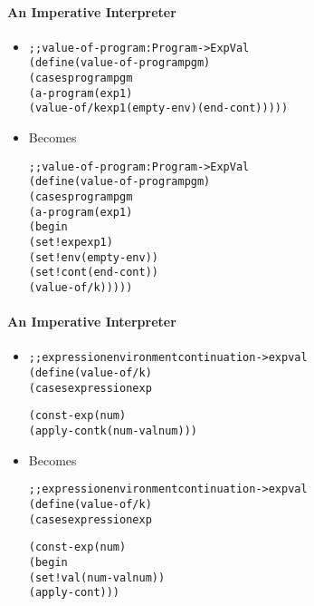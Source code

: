 \documentclass{beamer}
\begin{document}
\begin{frame}[fragile]
\framesubtitle{An Imperative Interpreter}
\begin{scriptsize}
\begin{itemize}
\item<1-> 
\begin{alltt}
;; value-of-program : Program -> ExpVal
(define (value-of-program pgm)
  (cases program pgm
    (a-program (exp1)
               (value-of/k exp1 (empty-env) (end-cont)))))
\end{alltt}

\item<1-> Becomes
\begin{alltt}
;; value-of-program : Program -> ExpVal
(define (value-of-program pgm)
  (cases program pgm
    (a-program (exp1)
               (begin
                 (set! exp exp1)
                 (set! env (empty-env))
                 (set! cont (end-cont))
                 (value-of/k)))))
\end{alltt}


\end{itemize}
\end{scriptsize}
\end{frame}

\begin{frame}[fragile]
\framesubtitle{An Imperative Interpreter}
\begin{scriptsize}
\begin{itemize}
\item<1-> 
\begin{alltt}
;; expression environment continuation -> expval
(define (value-of/k)
  (cases expression exp

    (const-exp (num)
               (apply-cont k (num-val num)))
\end{alltt}

\item<1-> Becomes
\begin{alltt}
;; expression environment continuation -> expval
(define (value-of/k)
  (cases expression exp

    (const-exp (num)
               (begin
                 (set! val (num-val num))
                 (apply-cont)))
\end{alltt}

\end{itemize}
\end{scriptsize}
\end{frame}
\end{document}
